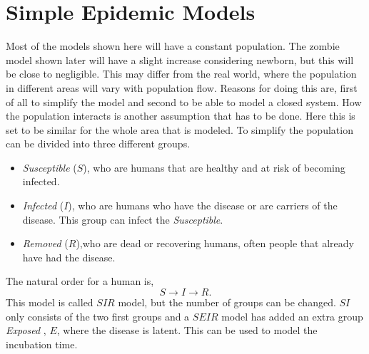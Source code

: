 \documentclass[%
twoside,                 %
final,                   %
chapterprefix=true,      %
open=right               %
10pt]{book}
\begin{document}
\section{Simple Epidemic Models}
Most of the models shown here will have a constant population. The zombie model shown later will have a slight increase considering newborn, but this will be close to negligible. This may differ from the real world, where the population in different areas will vary with population flow. Reasons for doing this are, first of all to simplify the model and second to be able to model a closed system. How the population interacts is another assumption that has to be done. Here this is set to be similar for the whole area that is modeled. To simplify the population can be divided into three different groups. 
\begin{itemize}
\item \emph{Susceptible} ($S$), who are humans that are healthy and at risk of becoming infected. 

\item \emph{Infected} ($I$), who are humans who have the disease or are carriers of the disease. This group can infect the \emph{Susceptible}. 

\item \emph{Removed} ($R$),who are dead or recovering humans, often people that already have had the disease. 
\end{itemize}

\noindent
The natural order for a human is,
\begin{equation*}
S \rightarrow I \rightarrow R.
\end{equation*}
This model is called $SIR$ model, but the number of groups can be changed. $SI$ only consists of the two first groups and a $SEIR$ model has added an extra group \emph{Exposed} , $E$, where the disease is latent. This can be used to model the incubation time. 


\vspace{3mm}




\vspace{3mm}
\end{document}
